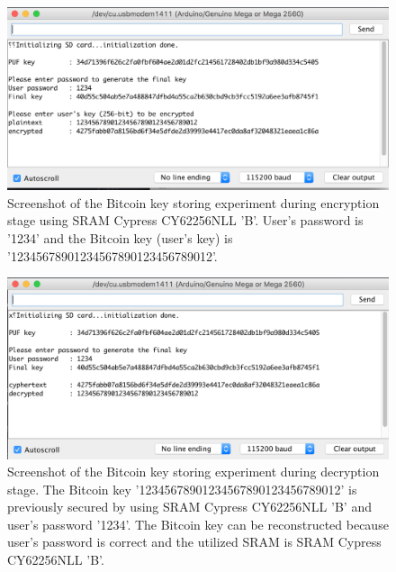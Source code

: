 \begin{figure}[tph!]
    \centerline{\includegraphics[width={\textwidth}]{images/B_encrypt}}
    \caption{Screenshot of the Bitcoin key storing experiment during encryption stage using SRAM Cypress CY62256NLL 'B'.
    User's password is '1234' and the Bitcoin key (user's key) is '12345678901234567890123456789012'.}
    \label{fig:B_encrypt}
\end{figure}

\begin{figure}[tph!]
    \centerline{\includegraphics[width={\textwidth}]{images/B_decrypt_correct}}
    \caption{Screenshot of the Bitcoin key storing experiment during decryption stage. The Bitcoin key '12345678901234567890123456789012' is previously secured by using SRAM Cypress CY62256NLL 'B' and user's password '1234'.
    The Bitcoin key can be reconstructed because user's password is correct and the utilized SRAM is SRAM Cypress CY62256NLL 'B'.}
    \label{fig:B_decrypt_correct}
\end{figure}

